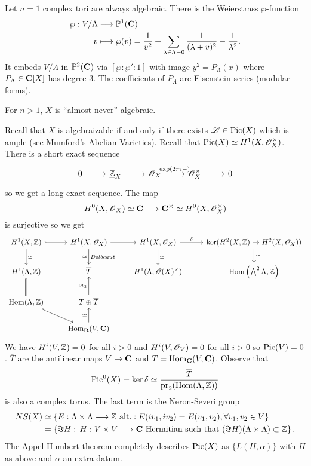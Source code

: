\begin{example}
	Let $n=1$ complex tori are always algebraic. There is the Weierstrass $\wp$-function
	\begin{align*}
		\wp: V /\Lambda &\longrightarrow \mathbb{P}^{1}(\mathbf{C}) \\
		v &\longmapsto \wp(v) = \frac{1}{v^2} + \sum_{\lambda\in \Lambda-0}\frac{1}{(\lambda+v)^2}-\frac{1}{\lambda^2}
	.\end{align*}
	It embeds $V /\Lambda$ in $\mathbb{P}^2(\mathbf{C})$ via $[\wp:\wp':1]$ with image $y^2=P_\Lambda(x)$ where $P_\Lambda\in \mathbf{C}[X]$ has degree 3. The coefficients of $P_\Lambda$ are Eisenstein series (modular forms).

	For $n>1$, $X$ is ``almost never'' algebraic.
\end{example}
Recall that $X$ is algebraizable if and only if there exists $\mathscr{L}\in \operatorname{Pic}(X)$ which is ample (see Mumford's Abelian Varieties). Recall that $\operatorname{Pic}(X)\simeq H^{1}(X,\mathscr{O}_X^{\times})$. There is a short exact sequence
\begin{equation}
\begin{tikzcd}
	0 \ar[r] & \Zc_X \ar[r] & \OO_X \ar[r,"\exp(2\pi i-)"] & \OO_X^{\times} \ar[r] & 0
\end{tikzcd}
\end{equation}
so we get a long exact sequence. The map
\[
	H^{0}(X,\OO_X) \isoto \C \to \C^{\times}\isoto H^{0}(X,\OO_X^{\times})
\]
is surjective so we get
\begin{equation}
\begin{tikzcd}
	H^{1}(X,\Z) \ar[r,hook] \ar[d,"\isoto"] & H^{1}(X,\OO_X) \ar[d,"\isoto"',"Dolbeaut"] \ar[r] & H^{1}(X,\OO_X) \ar[d,"\isoto"] \ar[r,"\delta"] & \ker (H^2(X,\Z)\to H^2(X,\OO_X)) \ar[d,"\isoto"] \\
	H^{1}(\Lambda,\Z) \ar[d,equal] & \overline{T} & H^{1}(\Lambda,\OO(X)^{\times}) & \Hom\left( \bigwedge^2\Lambda,\Z \right)  \\
	\Hom(\Lambda,\Z) \ar[dr,hook] & T \oplus \overline{T} \ar[u,"\pr_2"] \\
				      & \Hom_{\R}(V,\C) \ar[u,"\isoto"]
\end{tikzcd}
\end{equation}
We have $H^{i}(V,\mathbb Z)=0$ for all $i>0$ and $H^{i}(V,\mathscr{O}_V)=0$ for all $i>0$ so $\operatorname{Pic}(V)=0$. $\overline{T}$ are the antilinear maps $V\to \C$ and $T=\operatorname{Hom}_{\mathbf{C}}(V,\mathbf{C})$. Observe that
\[
\operatorname{Pic}^{0}(X) = \operatorname{ker}\delta \simeq \frac{\overline{T}}{\operatorname{pr}_2(\operatorname{Hom}(\Lambda,\mathbb Z))}
\]
is also a complex torus. The last term is the Neron-Severi group
\begin{align*}
	NS(X) &\isoto \{E:\Lambda\times \Lambda\to \Z\text{ alt.}: E(iv_1,iv_2)=E(v_1,v_2), \forall v_1,v_2\in V\} \\
	      &= \left\{ \Im H:\, H:V\times V\to \C\text{ Hermitian such that }(\Im H)(\Lambda\times \Lambda)\subset \Z \right\} 
.\end{align*}
The Appel-Humbert theorem completely describes $\operatorname{Pic}(X)$ as $\{L(H,\alpha)\} $ with $H$ as above and $\alpha$ an extra datum.


